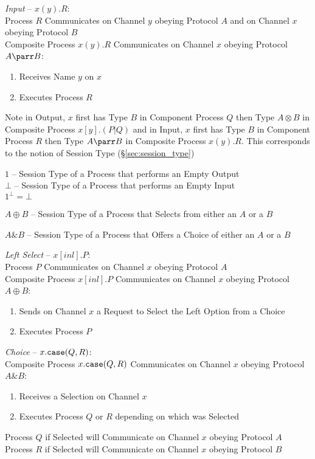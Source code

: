 \emph{Input} -- $x(y).R$: \\
Process $R$ Communicates on Channel $y$ obeying Protocol $A$ and on
Channel $x$ obeying Protocol $B$ \\
Composite Process $x(y).R$ Communicates on Channel $x$ obeying
Protocol $A \parr B$:
\begin{enumerate}
  \item Receives Name $y$ on $x$
  \item Executes Process $R$
\end{enumerate}

\fist Note in Output, $x$ first has Type $B$ in Component Process $Q$
then Type $A \otimes B$ in Composite Process $x[y].(P|Q)$ and in
Input, $x$ first has Type $B$ in Component Process $R$ then Type $A
\parr B$ in Composite Process $x(y).R$. This corresponds to the notion
of Session Type (\S\ref{sec:session_type})

$1$ -- Session Type of a Process that performs an Empty Output \\
$\bot$ -- Session Type of a Process that performs an Empty Input \\
$1^\bot = \bot$



$A \oplus B$ -- Session Type of a Process that Selects from either an
$A$ or a $B$

$A \& B$ -- Session Type of a Process that Offers a Choice of either
an $A$ or a $B$

\emph{Left Select} -- $x[inl].P$: \\
Process $P$ Communicates on Channel $x$ obeying Protocol $A$ \\
Composite Process $x[inl].P$ Communicates on Channel $x$ obeying
Protocol $A \oplus B$:
\begin{enumerate}
  \item Sends on Channel $x$ a Request to Select the Left Option from
    a Choice
  \item Executes Process $P$
\end{enumerate}

\emph{Choice} -- $x.\mathtt{case}(Q,R)$: \\
Composite Process $x.\mathtt{case}(Q,R)$ Communicates on Channel $x$
obeying Protocol $A \& B$:
\begin{enumerate}
  \item Receives a Selection on Channel $x$
  \item Executes Process $Q$ or $R$ depending on which was Selected
\end{enumerate}
Process $Q$ if Selected will Communicate on Channel $x$ obeying
Protocol $A$ \\
Process $R$ if Selected will Communicate on Channel $x$ obeying
Protocol $B$

